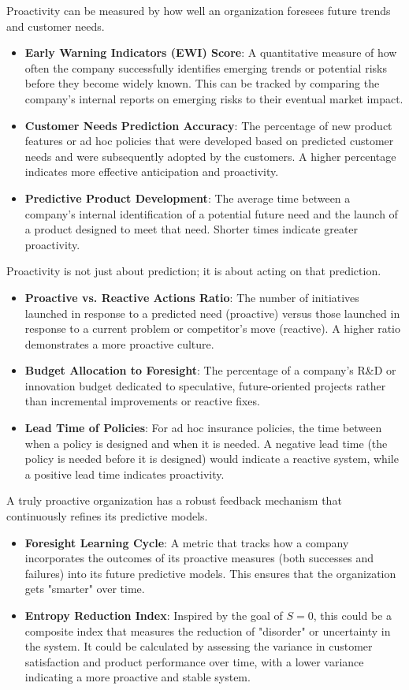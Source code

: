 \documentclass{article}
\begin{document}
 
 Proactivity can be measured by how well an organization foresees future trends and customer needs.
 \begin{itemize}
 	\item \textbf{Early Warning Indicators (EWI) Score}: A quantitative measure of how often the company successfully identifies emerging trends or potential risks before they become widely known. This can be tracked by comparing the company's internal reports on emerging risks to their eventual market impact.
 	\item \textbf{Customer Needs Prediction Accuracy}: The percentage of new product features or ad hoc policies that were developed based on predicted customer needs and were subsequently adopted by the customers. A higher percentage indicates more effective anticipation and proactivity.
 	\item \textbf{Predictive Product Development}: The average time between a company's internal identification of a potential future need and the launch of a product designed to meet that need. Shorter times indicate greater proactivity.
 \end{itemize}
 
 
 Proactivity is not just about prediction; it is about acting on that prediction.
 \begin{itemize}
 	\item \textbf{Proactive vs. Reactive Actions Ratio}: The number of initiatives launched in response to a predicted need (proactive) versus those launched in response to a current problem or competitor's move (reactive). A higher ratio demonstrates a more proactive culture.
 	\item \textbf{Budget Allocation to Foresight}: The percentage of a company's R\&D or innovation budget dedicated to speculative, future-oriented projects rather than incremental improvements or reactive fixes.
 	\item \textbf{Lead Time of Policies}: For ad hoc insurance policies, the time between when a policy is designed and when it is needed. A negative lead time (the policy is needed before it is designed) would indicate a reactive system, while a positive lead time indicates proactivity.
 \end{itemize}

 
 A truly proactive organization has a robust feedback mechanism that continuously refines its predictive models.
 \begin{itemize}
 	\item \textbf{Foresight Learning Cycle}: A metric that tracks how a company incorporates the outcomes of its proactive measures (both successes and failures) into its future predictive models. This ensures that the organization gets "smarter" over time.
 	\item \textbf{Entropy Reduction Index}: Inspired by the goal of $S=0$, this could be a composite index that measures the reduction of "disorder" or uncertainty in the system. It could be calculated by assessing the variance in customer satisfaction and product performance over time, with a lower variance indicating a more proactive and stable system.
 \end{itemize}
 
\end{document}
